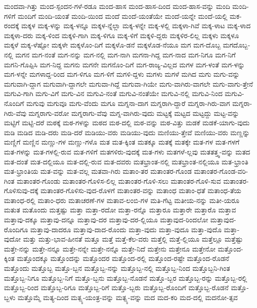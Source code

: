 {ಮಂದವಾ-ಗಿತ್ತು
ಮಂದ-ಸ್ಪಂದನ-ಗಳೆ-ರಡೂ
ಮಂದ-ಹಾಸ
ಮಂದ-ಹಾಸ-ದಿಂದ
ಮಂದ-ಹಾಸ-ವನ್ನು
ಮಂದಿ
ಮಂದಿ-ಗಳಿಗೆ
ಮಂದಿಗೆ
ಮಂದಿ-ಯಂತೆ
ಮಂದಿ-ಯಿಂದ
ಮಂದೆ
ಮಂದೆ-ಯಂತೆಯೇ
ಮಂದೆ-ಯನ್ನೇ
ಮಂದೆ-ಯಲ್ಲಿ
ಮಕ-ರಂದಕ್ಕೆ
ಮಕ್ಕಳ
ಮಕ್ಕ-ಳನ್ನು
ಮಕ್ಕ-ಳನ್ನೂ
ಮಕ್ಕಳ-ನ್ನೆಲ್ಲಾ
ಮಕ್ಕ-ಳನ್ನೇ
ಮಕ್ಕ-ಳಲ್ಲಿ
ಮಕ್ಕಳಾ-ಗಿವೆ
ಮಕ್ಕ-ಳಾಟ
ಮಕ್ಕ-ಳಾದ
ಮಕ್ಕಳಾ-ದರು
ಮಕ್ಕ-ಳಿಂದ
ಮಕ್ಕಳಿ-ಗಾಗಿ
ಮಕ್ಕ-ಳಿಗೂ
ಮಕ್ಕ-ಳಿಗೆ
ಮಕ್ಕಳಿ-ದ್ದರು
ಮಕ್ಕಳಿರ-ಲಿಲ್ಲ
ಮಕ್ಕಳು
ಮಕ್ಕಳೂ
ಮಕ್ಕಳೆ
ಮಕ್ಕ-ಳೆಷ್ಟೋ
ಮಕ್ಕಳೇ
ಮಕ್ಕಳೊಂ-ದಿಗೆ
ಮಕ್ಕಳೊ-ಡನೆ
ಮಕ್ಕಳೊಡ-ನೆಯೂ
ಮಗ
ಮಗ-ದೊಬ್ಬ
ಮಗದೊಬ್ಬ-ನಲ್ಲಿ
ಮಗನ
ಮಗ-ನಂತೆ
ಮಗ-ನನ್ನು
ಮಗ-ನಲ್ಲಿ
ಮಗ-ನಾಗಿ
ಮಗನಾ-ಗಿದ್ದ
ಮಗ-ನಾದ
ಮಗ-ನಿಗೂ
ಮಗ-ನಿಗೆ
ಮಗನಿ-ಗೊಪ್ಪಿಸಿ
ಮಗ-ನಿದ್ದ
ಮಗನು
ಮಗನೇ
ಮಗನೊಂ-ದಿಗೆ
ಮಗ-ರಾಜ್ಯ-ವಿಲ್ಲದ
ಮಗಳ
ಮಗ-ಳಂತೆ
ಮಗ-ಳನ್ನು
ಮಗ-ಳನ್ನೇ
ಮಗಳಾದ್ದ-ರಿಂದ
ಮಗ-ಳಿಗೂ
ಮಗ-ಳಿಗೆ
ಮಗಳಿ-ದ್ದಳು
ಮಗಳು
ಮಗಳೆ
ಮಗಿದ
ಮಗು
ಮಗು-ವನ್ನು
ಮಗುವಾಗಿ-ದ್ದಾಗ
ಮಗುವಾಗಿ-ದ್ದಾಗಲೇ
ಮಗುವಾ-ಗಿದ್ದೆ
ಮಗುವಾ-ಗಿಯೇ
ಮಗು-ವಾಗಿರು-ವಾಗಲೇ
ಮಗು-ವಾಗು-ತ್ತೇನೆ
ಮಗುವಿ-ಗಾಗಿ
ಮಗು-ವಿಗೆ
ಮಗು-ವಿನ
ಮಗುವಿ-ನಂತೆ
ಮಗುವಿ-ನಂತೆಯೇ
ಮಗುವಿ-ನಲ್ಲಿ
ಮಗುವಿ-ನಿಂದ
ಮಗುವಿ-ನೊಂದಿಗೆ
ಮಗುವು
ಮಗುವೂ
ಮಗು-ವೆಂದು
ಮಗೂ
ಮಗ್ನನಾ-ದಾಗ
ಮಗ್ನರಾಗಿ-ದ್ದಾರೆ
ಮಗ್ನರಾ-ಗಿರು-ವಾಗ
ಮಗ್ನರಾ-ಗಿರು-ವೆವು
ಮಗ್ನರಾಗು-ವರೋ
ಮಗ್ನರಾಗು-ವೆವು
ಮಗ್ನ-ವಾಗಿರು-ವುದು
ಮಟ್ಟಕ್ಕೆ
ಮಟ್ಟದ
ಮಟ್ಟದ್ದು
ಮಟ್ಟ-ವನ್ನು
ಮಟ್ಟಿಗೆ
ಮಟ್ಟಿ-ದರೆ
ಮಠಕ್ಕೆ
ಮಠ-ಗಳನ್ನು
ಮಠದ
ಮಠ-ದಲ್ಲಿ
ಮಠ-ವನ್ನು
ಮಠ-ವಿತ್ತು
ಮಡಕೆ
ಮಡಕೆ-ಯಾಗು-ವುದು
ಮಡಿ
ಮಡಿದ
ಮಡಿ-ದರು
ಮಡಿ-ದರೆ
ಮಡಿಯು-ವರು
ಮಡಿಯು-ವುದು
ಮಣಿಯು-ತ್ತೇವೆ
ಮಣಿಯು-ವರು
ಮಣ್ಣನ್ನು
ಮಣ್ಣಿಗೆ
ಮಣ್ಣಿನ
ಮಣ್ಣು-ಗಳ
ಮಣ್ಣು-ಗಳೊ
ಮತ
ಮತ-ಕ್ಕಿಂತ
ಮತಕ್ಕೂ
ಮತಕ್ಕೆ
ಮತಕ್ಕೇ
ಮತ-ಗಳ
ಮತ-ಗಳಗೆ
ಮತ-ಗಳನ್ನು
ಮತ-ಗಳಲ್ಲಿ-ರುವ
ಮತ-ಗಳಿಗೆ
ಮತಗಳಿರು-ವುದಕ್ಕೆ
ಮತ-ಗಳು
ಮತಗಳೆ-ಲ್ಲವು
ಮತತತ್ತ್ವ-ವನ್ನು
ಮತದ
ಮತ-ದಂತೆ
ಮತ-ದಲ್ಲಿಯೂ
ಮತ-ದಲ್ಲಿ-ರುವ
ಮತ-ದವರು
ಮತಭ್ರಾಂತ-ನಲ್ಲಿ
ಮತಭ್ರಾಂತ-ನಲ್ಲಿಯೂ
ಮತ-ಭ್ರಾಂತಿ
ಮತ-ಭ್ರಾಂತಿಯ
ಮತ-ವನ್ನು
ಮತ-ವಲ್ಲ
ಮತವಾ-ಗಿರು
ಮತಾಂ-ತರ
ಮತಾಂತರ-ಗೊಂಡ
ಮತಾಂತರ-ಗೊಂಡ-ವರಿ-ಗಿಂತ
ಮತಾಂತರ-ಗೊಂಡು
ಮತಾಂತರ-ಗೊಳಿಸ-ಲಿಲ್ಲ
ಮತಾಂತರ-ಗೊಳಿ-ಸಲು
ಮತಾಂತರ-ಗೊಳಿ-ಸುವ
ಮತಾಂತರ-ಗೊಳಿಸುವು-ದಕ್ಕೆ
ಮತಾಂತರ-ಗೊಳಿಸು-ವುದ-ರೊಳಗೆ
ಮತಾಂತರ-ವನ್ನು
ಮತಾಂಧ
ಮತಾಂ-ಧತೆ
ಮತಾಂಧ-ತೆಯ
ಮತಾಂಧ-ರಲ್ಲಿ
ಮತಾಂ-ಧರು
ಮತಾಚರಣೆ-ಗಳ
ಮತಾವ-ಲಂಬಿ-ಗಳ
ಮತಿ-ಗೆಟ್ಟ
ಮತೀಯ-ನನ್ನು
ಮತೀ-ಯರೂ
ಮತುತ
ಮತೊಂದು
ಮತ್ತಷ್ಟು
ಮತ್ತಾ
ಮತ್ತಾ-ರದೋ
ಮತ್ತಾ-ರನ್ನೊ
ಮತ್ತಾರೂ
ಮತ್ತಾರೇ
ಮತ್ತಾರೊ
ಮತ್ತಾವ
ಮತ್ತಾವು-ದಕ್ಕೂ
ಮತ್ತಾವು-ದನ್ನೂ
ಮತ್ತಾವು-ದರ
ಮತ್ತಾವು-ದರ-ಲ್ಲಿಯೂ
ಮತ್ತಾವುದ-ರಿಂದಲೋ
ಮತ್ತಾವುದ-ರೊಂದಿಗೂ
ಮತ್ತಾವು-ದಾದರೂ
ಮತ್ತಾವು-ದಾದ-ರೊಂದು
ಮತ್ತಾ-ವುದು
ಮತ್ತಾ-ವುದೂ
ಮತ್ತಾ-ವುದೊ
ಮತ್ತಾ-ವುದೋ
ಮತ್ತು
ಮತ್ತು-ಭಾವ-ಹೀನತೆ
ಮತ್ತೂ
ಮತ್ತೆ
ಮತ್ತೆ-ಕೆಲ-ವರು
ಮತ್ತೆಲ್ಲಿ
ಮತ್ತೆ-ಲ್ಲಿಯೂ
ಮತ್ತೆಲ್ಲೂ
ಮತ್ತೆಷ್ಟು
ಮತ್ತೇ-ನನ್ನು
ಮತ್ತೇ-ನನ್ನೂ
ಮತ್ತೇ-ನನ್ನೇ
ಮತ್ತೇ-ನನ್ನೊ
ಮತ್ತೇ-ನಿದೆ
ಮತ್ತೇನು
ಮತ್ತೇನೂ
ಮತ್ತೇನೋ
ಮತ್ತೊಂದ-ಕ್ಕಿಂತ
ಮತ್ತೊಂದಕ್ಕೂ
ಮತ್ತೊಂದನ್ನು
ಮತ್ತೊಂದರ
ಮತ್ತೊಂದ-ರಲ್ಲಿ
ಮತ್ತೊಂದ-ರಷ್ಟೇ
ಮತ್ತೊಂದ-ರೊಡನೆ
ಮತ್ತೊಂದು
ಮತ್ತೊಬ್ಬ
ಮತ್ತೊ-ಬ್ಬನ
ಮತ್ತೊಬ್ಬ-ನನ್ನು
ಮತ್ತೊಬ್ಬ-ನಲ್ಲಿ
ಮತ್ತೊಬ್ಬ-ನಿಂದ
ಮತ್ತೊಬ್ಬನಿ-ಗಿಂತ
ಮತ್ತೊಬ್ಬ-ನಿಗೂ
ಮತ್ತೊಬ್ಬ-ನಿಗೆ
ಮತ್ತೊ-ಬ್ಬನು
ಮತ್ತೊಬ್ಬ-ನೊಡನೆ
ಮತ್ತೊ-ಬ್ಬರ
ಮತ್ತೊಬ್ಬ-ರನ್ನು
ಮತ್ತೊಬ್ಬ-ರಲ್ಲಿ
ಮತ್ತೊಬ್ಬ-ರಿಂದ
ಮತ್ತೊಬ್ಬ-ರಿಗೂ
ಮತ್ತೊಬ್ಬ-ರಿಗೆ
ಮತ್ತೊ-ಬ್ಬರು
ಮತ್ತೊಬ್ಬ-ರೊಂದಿಗೆ
ಮತ್ತೊಬ್ಬ-ರೊಡನೆ
ಮತ್ತೊ-ಬ್ಬಳು
ಮತ್ತೊಮ್ಮೆ
ಮತ್ಯ-ದಿಂದ
ಮತ್ಸ್ಯ-ಯಂತ್ರ-ವನ್ನು
ಮತ್ಸ್ಯ-ವನ್ನು
ಮದ
ಮದ-ಕರಿ
ಮದ-ದಲ್ಲಿ
ಮದನೋ-ತ್ಸವ
}
